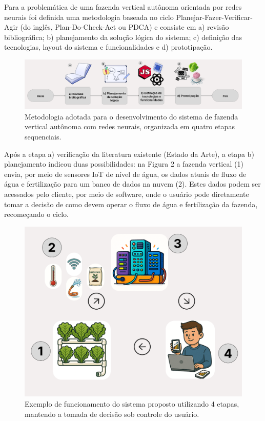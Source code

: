 Para a problemática de uma fazenda vertical autônoma orientada por redes neurais foi definida uma metodologia baseada no ciclo Planejar-Fazer-Verificar-Agir (do inglês, Plan-Do-Check-Act ou PDCA) e consiste em a) revisão bibliográfica; b) planejamento da solução lógica do sistema; c) definição das tecnologias, layout do sistema e funcionalidades e d) prototipação.
\begin{figure}[H]
    \centering
    \includegraphics[scale=0.08]{Illustrations/Figura 1.png} %
    \caption{Metodologia adotada para o desenvolvimento do sistema de fazenda vertical autônoma com redes neurais, organizada em quatro etapas sequenciais.
}
    \label{fcht:figura1}
\end{figure}

Após a etapa a) verificação da literatura existente (Estado da Arte), a etapa b) planejamento indicou duas possibilidades: na Figura 2 a fazenda vertical (1) envia, por meio de sensores IoT de nível de água, os dados atuais de fluxo de água e fertilização para um banco de dados na nuvem (2). Estes dados podem ser acessados pelo cliente, por meio de software, onde o usuário pode diretamente tomar a decisão de como devem operar o fluxo de água e fertilização da fazenda, recomeçando o ciclo.


\begin{figure}[H]
    \centering
    \includegraphics[scale=0.2]{Illustrations/Figura 2.png} %
    \caption{Exemplo de funcionamento do sistema proposto utilizando 4 etapas, mantendo a tomada de decisão sob controle do usuário.}
    \label{fcht:figura2}
\end{figure}


